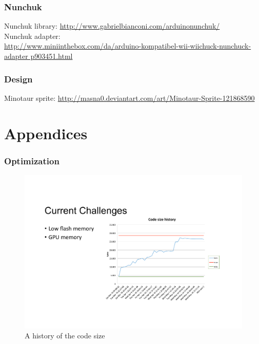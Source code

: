 \documentclass[12pt]{report}
\begin{document}
\subsection*{Nunchuk}
Nunchuk library: \url{http://www.gabrielbianconi.com/arduinonunchuk/} \\
Nunchuk adapter: \\ \url{http://www.miniinthebox.com/da/arduino-kompatibel-wii-wiichuck-nunchuck-adapter p903451.html}

\subsection*{Design}
Minotaur sprite: \url{http://masna0.deviantart.com/art/Minotaur-Sprite-121868590}

\newpage
\chapter{Appendices}


\subsection*{Optimization}
\begin{figure}[h]
  \centering
  \includegraphics[scale=1]{Figures/CodeSizeChart}
  \caption{A history of the code size}
  \label{fig:code_size}
\end{figure}
\newpage
\end{document}
